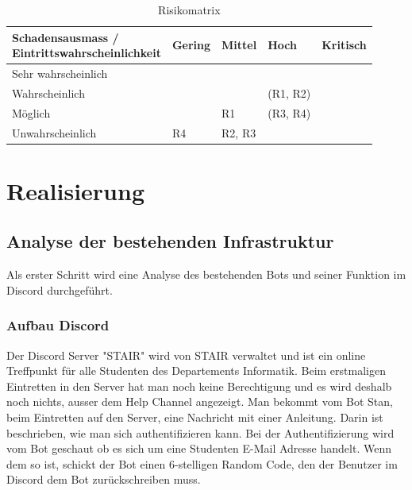 \documentclass[a4paper, table]{article}
\begin{document}
\begin{table}[h]
    \centering
    \begin{tabular}{|l|p{2cm}|p{2cm}|p{2cm}|p{2cm}|}
        \hline
        \shortstack[c]{Schadensausmass / \\ Eintrittswahrscheinlichkeit} & Gering & Mittel & Hoch & Kritisch \\[10pt]
        \hline
        Sehr wahrscheinlich & \cellcolor{yellow!50} & \cellcolor{orange!50} & \cellcolor{red!50} & \cellcolor{red!50} \\[10pt]
        \hline
        Wahrscheinlich & \cellcolor{yellow!50} & \cellcolor{yellow!50}& \cellcolor{orange!50}(R1, R2) & \cellcolor{red!50} \\[10pt]
        \hline
        Möglich & \cellcolor{green!50} & \cellcolor{yellow!50}R1 & \cellcolor{yellow!50}(R3, R4) & \cellcolor{orange!50} \\[10pt]
        \hline
        Unwahrscheinlich & \cellcolor{green!50}R4 & \cellcolor{green!50}R2, R3 & \cellcolor{yellow!50} & \cellcolor{yellow!50} \\[10pt]
        \hline
    \end{tabular}
    \caption{Risikomatrix}
    \label{tab: Riskmatrix}
\end{table}

\clearpage
\section{Realisierung}

\subsection{Analyse der bestehenden Infrastruktur}
Als erster Schritt wird eine Analyse des bestehenden Bots und seiner Funktion im Discord durchgef\"uhrt.

\subsubsection{Aufbau Discord}
Der Discord Server "STAIR" wird von STAIR verwaltet und ist ein online Treffpunkt f\"ur alle Studenten des Departements Informatik.
Beim erstmaligen Eintretten in den Server hat man noch keine Berechtigung und es wird deshalb noch nichts, ausser dem Help Channel
angezeigt. Man bekommt vom Bot Stan, beim Eintretten auf den Server, eine Nachricht mit einer Anleitung. Darin ist beschrieben, wie
man sich authentifizieren kann. Bei der Authentifizierung wird vom Bot geschaut ob es sich um eine Studenten E-Mail Adresse handelt.
Wenn dem so ist, schickt der Bot einen 6-stelligen Random Code, den der Benutzer im Discord dem Bot zur\"uckschreiben muss.
\end{document}
